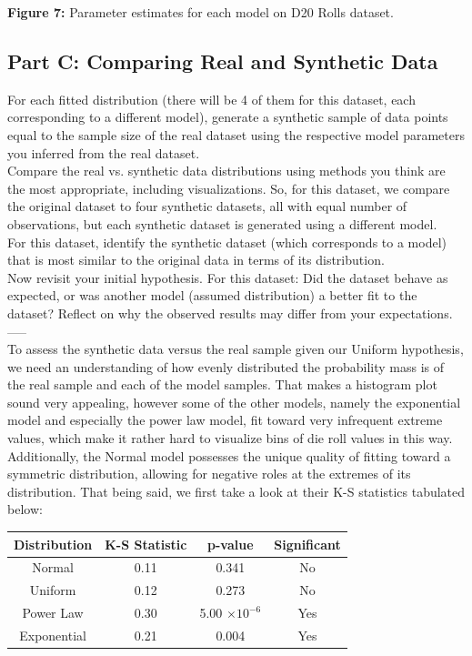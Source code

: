 \begin{center}
\textbf{Figure 7:} Parameter estimates for each model on D20 Rolls dataset.
\end{center}
\newpage

\subsection{Part C: Comparing Real and Synthetic Data}

For each fitted distribution (there will be 4 of them for this dataset, each corresponding to a different model), generate a synthetic sample of data points equal to the sample size of the real dataset using the respective model parameters you inferred from the real dataset.\\

Compare the real vs. synthetic data distributions using methods you think are the most appropriate, including visualizations. So, for this dataset, we compare the original dataset to four synthetic datasets, all with equal number of observations, but each synthetic dataset is generated using a different model.\\

For this dataset, identify the synthetic dataset (which corresponds to a model) that is most similar to the original data in terms of its distribution.\\

Now revisit your initial hypothesis. For this dataset: Did the dataset behave as expected, or was another model (assumed distribution) a better fit to the dataset? Reflect on why the observed results may differ from your expectations.\\
-----\\
To assess the synthetic data versus the real sample given our Uniform hypothesis, we need an understanding of how evenly distributed the probability mass is of the real sample and each of the model samples. That makes a histogram plot sound very appealing, however some of the other models, namely the exponential model and especially the power law model, fit toward very infrequent extreme values, which make it rather hard to visualize bins of die roll values in this way. Additionally, the Normal model possesses the unique quality of fitting toward a symmetric distribution, allowing for negative roles at the extremes of its distribution. That being said, we first take a look at their K-S statistics tabulated below:

\begin{center}
\begin{tabular}{|c|c|c|c|}
\hline
\textbf{Distribution} & \textbf{K-S Statistic} & \textbf{p-value} & \textbf{Significant} \\
\hline
Normal & 0.11 & 0.341 & No \\
\hline
Uniform & 0.12 & 0.273 & No \\
\hline
Power Law & 0.30 & 5.00 $\times 10^{-6}$ & Yes \\
\hline
Exponential & 0.21 & 0.004 & Yes \\
\hline
\end{tabular}
\end{center}


